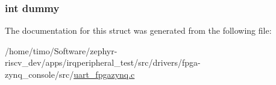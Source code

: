 \subsubsection[{\texorpdfstring{dummy}{dummy}}]{\setlength{\rightskip}{0pt plus 5cm}int dummy}\hypertarget{structuart__fpgazynq__device__config_a7c1d654b7b6114d7a0abc8d351dd1bcd}{}\label{structuart__fpgazynq__device__config_a7c1d654b7b6114d7a0abc8d351dd1bcd}


The documentation for this struct was generated from the following file\+:\begin{DoxyCompactItemize}
\item 
/home/timo/\+Software/zephyr-\/riscv\+\_\+dev/apps/irqperipheral\+\_\+test/src/drivers/fpga-\/zynq\+\_\+console/src/\hyperlink{uart__fpgazynq_8c}{uart\+\_\+fpgazynq.\+c}\end{DoxyCompactItemize}
